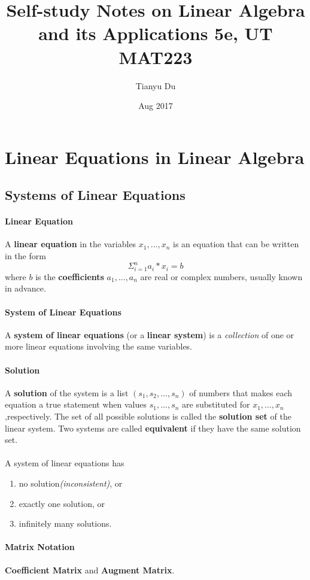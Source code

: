\documentclass{article}
\author{Tianyu Du}
\date{Aug 2017}
\title{Self-study Notes on Linear Algebra and its Applications 5e, UT MAT223}
\begin{document}
	\maketitle
	\tableofcontents
	\section{Linear Equations in Linear Algebra}
	\subsection{Systems of Linear Equations}
	\paragraph{Linear Equation} A \textbf{linear equation} in the variables $x_1,...,x_n$ is an equation that can be written in the form
	\[
	\Sigma_{i=1}^n a_i*x_i = b
	\]
	where $b$ is the \textbf{coefficients} $a_1,...,a_n$ are real or complex numbers, usually known in advance.
	\paragraph{System of Linear Equations} A \textbf{system of linear equations} (or a \textbf{linear system}) is a \emph{collection} of one or more linear equations involving the same variables.
	\paragraph{Solution} A \textbf{solution} of the system is a list $(s_1,s_2,...,s_n)$ of numbers that makes each equation a true statement when values $s_1,...,s_n$ are substituted for $x_1,...,x_n$,respectively. The set of all possible solutions is called the \textbf{solution set} of the linear system. Two systems are called \textbf{equivalent} if they have the same solution set.
	\paragraph{} A system of linear equations has
	\begin{enumerate}
		\item no solution\emph{(inconsistent)}, or
		\item exactly one solution, or
		\item infinitely many solutions.
	\end{enumerate}
	\paragraph{Matrix Notation} \textbf{Coefficient Matrix} and \textbf{Augment Matrix}.
\end{document}
